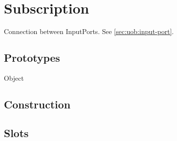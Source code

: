 
\section{Subscription}

Connection between InputPorts.  See \autoref{sec:uob:input-port}.

\subsection{Prototypes}
\begin{refObjects}
\item[Object]
\end{refObjects}

\subsection{Construction}

\subsection{Slots}


